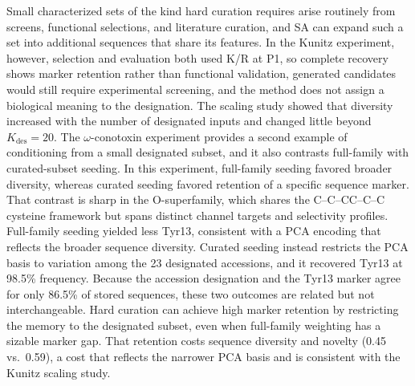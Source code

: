 Small characterized sets of the kind hard curation requires arise routinely from screens,
functional selections, and literature curation, and SA can expand such a set into additional
sequences that share its features. In the Kunitz experiment, however, selection and evaluation
both used K/R at P1, so complete recovery shows marker retention rather than functional
validation, generated candidates would still require experimental screening, and the method
does not assign a biological meaning to the designation. The scaling study showed that
diversity increased with the number of designated inputs and changed little beyond
$K_{\mathrm{des}}=20$. The $\omega$-conotoxin experiment provides a second example of
conditioning from a small designated subset, and it also contrasts full-family with
curated-subset seeding. In this experiment, full-family seeding favored broader diversity,
whereas curated seeding favored retention of a specific sequence marker. That contrast is sharp
in the O-superfamily,
which shares the C--C--CC--C--C cysteine framework but spans distinct channel targets and
selectivity profiles. Full-family seeding yielded less Tyr13, consistent with a PCA encoding
that reflects the broader sequence diversity. Curated seeding instead
restricts the PCA basis to variation among the 23 designated accessions, and it recovered
Tyr13 at 98.5\% frequency. Because the accession designation and the Tyr13 marker agree for only
86.5\% of stored sequences, these two outcomes are related but not interchangeable.
Hard curation can achieve high marker retention by restricting the memory to the designated
subset, even when full-family weighting has a sizable marker gap. That retention costs sequence
diversity and novelty (0.45 vs.\ 0.59), a cost that reflects the
narrower PCA basis and is consistent with the Kunitz scaling study.


